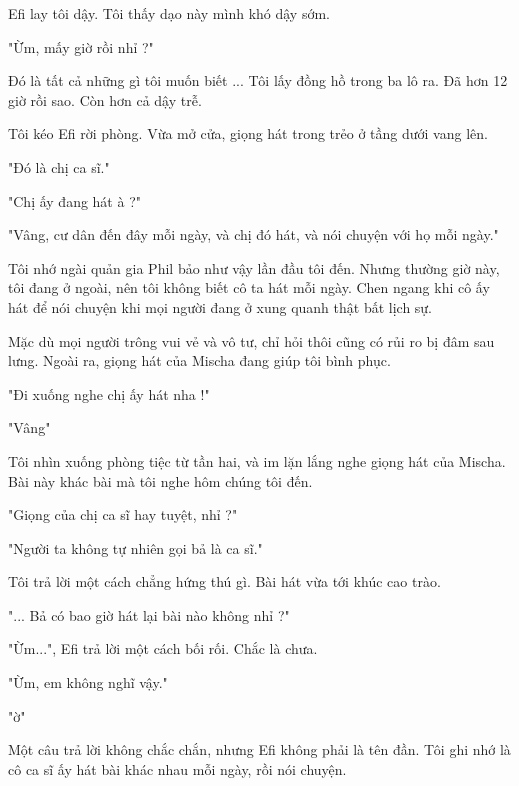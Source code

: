 
Efi lay tôi dậy. Tôi thấy dạo này mình khó dậy sớm.

"Ừm, mấy giờ rồi nhỉ ?"

Đó là tất cả những gì tôi muốn biết ... Tôi lấy đồng hồ trong ba lô ra. Đã hơn 12 giờ rồi sao. Còn hơn cả dậy trễ.

Tôi kéo Efi rời phòng. Vừa mở cửa, giọng hát trong trẻo ở tầng dưới vang lên.

"Đó là chị ca sĩ."

"Chị ấy đang hát à ?"

"Vâng, cư dân đến đây mỗi ngày, và chị đó hát, và nói chuyện với họ mỗi ngày."

Tôi nhớ ngài quản gia Phil bảo như vậy lần đầu tôi đến. Nhưng thường giờ này, tôi đang ở ngoài, nên tôi không biết cô ta hát mỗi ngày. Chen ngang khi cô ấy hát để nói chuyện khi mọi người đang ở xung quanh thật bất lịch sự. 

Mặc dù mọi người trông vui vẻ và vô tư, chỉ hỏi thôi cũng có rủi ro bị đâm sau lưng. Ngoài ra, giọng hát của Mischa đang giúp tôi bình phục.

"Đi xuống nghe chị ấy hát nha !"

"Vâng"

Tôi nhìn xuống phòng tiệc từ tần hai, và im lặn lắng nghe giọng hát của Mischa. Bài này khác bài mà tôi nghe hôm chúng tôi đến.

"Giọng của chị ca sĩ hay tuyệt, nhỉ ?"

"Người ta không tự nhiên gọi bả là ca sĩ."

Tôi trả lời một cách chẳng hứng thú gì. Bài hát vừa tới khúc cao trào.

"... Bả có bao giờ hát lại bài nào không nhỉ ?"

"Ừm...", Efi trả lời một cách bối rối. Chắc là chưa.

"Ừm, em không nghĩ vậy."

"ờ"

Một câu trả lời không chắc chắn, nhưng Efi không phải là tên đần. Tôi ghi nhớ là cô ca sĩ ấy hát bài khác nhau mỗi ngày, rồi nói chuyện. \\


